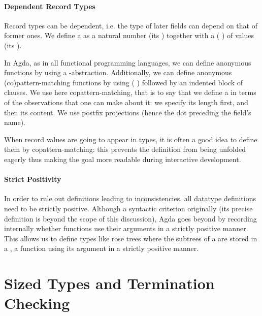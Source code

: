 \paragraph{Dependent Record Types}

Record types can be dependent, i.e. the type of later fields can depend on that of
former ones. We define a  as a natural number (its ) together
with a ( ) of values (its ).


In Agda, as in all functional programming languages, we can define anonymous functions
by using a -abstraction. Additionally, we can define anonymous (co)pattern-matching
functions by using ( ) followed by an indented block of clauses.
We use here copattern-matching, that is to say that we define a  in terms
of the observations that one can make about it: we specify its length first, and
then its content. We use postfix projections (hence the dot preceding the field's name).


When record values are going to appear in types, it is often a good idea to define
them by copattern-matching: this prevents the definition from being unfolded eagerly
thus making the goal more readable during interactive development.

\paragraph{Strict Positivity} In order to rule out definitions leading to
inconsistencies, all datatype definitions need to be strictly positive.
Although a syntactic criterion originally (its precise definition is beyond
the scope of this discussion), Agda goes beyond by recording internally
whether functions use their arguments in a strictly positive manner.
This allows us to define types like rose trees where the subtrees of a
 are stored in a , a function using its 
argument in a strictly positive manner.


\section{Sized Types and Termination Checking}

